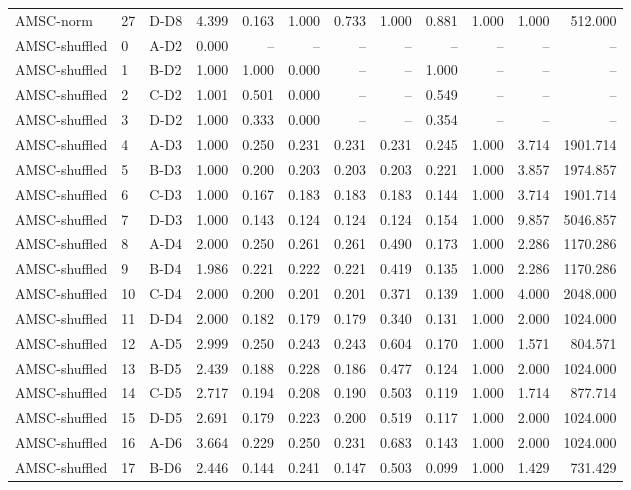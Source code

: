 \begin{table}[ht]
\begin{tabular}{lllrrrrrrrrr}
AMSC-norm & 27 & D-D8 & 4.399 & 0.163 & 1.000 & 0.733 & 1.000 & 0.881 & 1.000 & 1.000 & 512.000 \\
AMSC-shuffled & 0 & A-D2 & 0.000 & -- & -- & -- & -- & -- & -- & -- & -- \\
AMSC-shuffled & 1 & B-D2 & 1.000 & 1.000 & 0.000 & -- & -- & 1.000 & -- & -- & -- \\
AMSC-shuffled & 2 & C-D2 & 1.001 & 0.501 & 0.000 & -- & -- & 0.549 & -- & -- & -- \\
AMSC-shuffled & 3 & D-D2 & 1.000 & 0.333 & 0.000 & -- & -- & 0.354 & -- & -- & -- \\
AMSC-shuffled & 4 & A-D3 & 1.000 & 0.250 & 0.231 & 0.231 & 0.231 & 0.245 & 1.000 & 3.714 & 1901.714 \\
AMSC-shuffled & 5 & B-D3 & 1.000 & 0.200 & 0.203 & 0.203 & 0.203 & 0.221 & 1.000 & 3.857 & 1974.857 \\
AMSC-shuffled & 6 & C-D3 & 1.000 & 0.167 & 0.183 & 0.183 & 0.183 & 0.144 & 1.000 & 3.714 & 1901.714 \\
AMSC-shuffled & 7 & D-D3 & 1.000 & 0.143 & 0.124 & 0.124 & 0.124 & 0.154 & 1.000 & 9.857 & 5046.857 \\
AMSC-shuffled & 8 & A-D4 & 2.000 & 0.250 & 0.261 & 0.261 & 0.490 & 0.173 & 1.000 & 2.286 & 1170.286 \\
AMSC-shuffled & 9 & B-D4 & 1.986 & 0.221 & 0.222 & 0.221 & 0.419 & 0.135 & 1.000 & 2.286 & 1170.286 \\
AMSC-shuffled & 10 & C-D4 & 2.000 & 0.200 & 0.201 & 0.201 & 0.371 & 0.139 & 1.000 & 4.000 & 2048.000 \\
AMSC-shuffled & 11 & D-D4 & 2.000 & 0.182 & 0.179 & 0.179 & 0.340 & 0.131 & 1.000 & 2.000 & 1024.000 \\
AMSC-shuffled & 12 & A-D5 & 2.999 & 0.250 & 0.243 & 0.243 & 0.604 & 0.170 & 1.000 & 1.571 & 804.571 \\
AMSC-shuffled & 13 & B-D5 & 2.439 & 0.188 & 0.228 & 0.186 & 0.477 & 0.124 & 1.000 & 2.000 & 1024.000 \\
AMSC-shuffled & 14 & C-D5 & 2.717 & 0.194 & 0.208 & 0.190 & 0.503 & 0.119 & 1.000 & 1.714 & 877.714 \\
AMSC-shuffled & 15 & D-D5 & 2.691 & 0.179 & 0.223 & 0.200 & 0.519 & 0.117 & 1.000 & 2.000 & 1024.000 \\
AMSC-shuffled & 16 & A-D6 & 3.664 & 0.229 & 0.250 & 0.231 & 0.683 & 0.143 & 1.000 & 2.000 & 1024.000 \\
AMSC-shuffled & 17 & B-D6 & 2.446 & 0.144 & 0.241 & 0.147 & 0.503 & 0.099 & 1.000 & 1.429 & 731.429 \\

\end{tabular}
\end{table}
